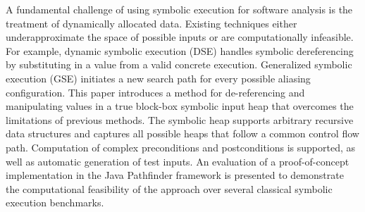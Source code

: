 
A fundamental challenge of using symbolic execution for software analysis is the treatment of dynamically allocated data. Existing techniques either underapproximate the space of possible inputs or are computationally infeasible. For example, dynamic symbolic execution (DSE) handles symbolic dereferencing by substituting in a value from a valid concrete execution. Generalized symbolic execution (GSE) initiates a new search path for every possible aliasing configuration. This paper introduces a method for de-referencing and manipulating values in a true block-box symbolic input heap that overcomes the limitations of previous methods. The symbolic heap supports arbitrary recursive data structures and captures all possible heaps that follow a common control flow path. Computation of complex preconditions and postconditions is supported, as well as automatic generation of test inputs. An evaluation of a proof-of-concept implementation in the Java Pathfinder framework is presented to demonstrate the computational feasibility of the approach over several classical symbolic execution benchmarks.


